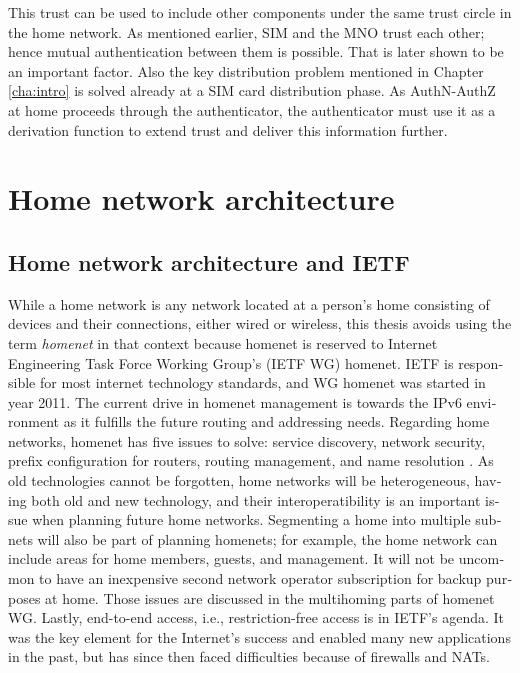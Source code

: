 \documentclass[12pt,a4paper,english]{tutthesis}
\begin{document}
\begin{otherlanguage}{english}
This trust can be used to include other components under the
same trust circle in the home network. As mentioned earlier,  SIM
and the MNO trust each other; hence mutual authentication between them is
possible. That is later shown to be an important factor.  Also the
key distribution problem mentioned in Chapter \ref{cha:intro} is solved
already at a SIM card distribution phase.  As AuthN-AuthZ at home
proceeds through the authenticator, the authenticator must
use it as a derivation function to extend trust 
 and deliver this information further.



\chapter{Home network architecture}
\label{sec-3}

\section{Home network architecture and IETF}
\label{sec-3-1}


While a home network is any network located at a person's home consisting
of devices and their connections, either wired or wireless,
this thesis avoids using the term \emph{homenet} in that context
because  homenet  is  reserved to 
Internet Engineering Task Force Working Group's (IETF
WG) homenet. IETF is responsible for  most internet technology standards, and 
WG homenet was started in year 2011.
The current drive in homenet management is towards the IPv6 environment
 as it fulfills the future routing and addressing needs. 
Regarding home networks, homenet has five issues to solve: service discovery, network security, 
prefix configuration for routers, routing management, and name
resolution \cite{homenet-charter}.
As old technologies cannot be forgotten, home networks will be heterogeneous, having both
old and new technology, and their interoperatibility is an important
issue when planning future home networks. 
Segmenting a home into multiple subnets will also be part of planning
 homenets; for example, the home network can include areas for home members, guests,
and management. It will not be uncommon to have an inexpensive second
network operator subscription for backup purposes at home. Those issues are
discussed in the  multihoming parts of homenet WG.
Lastly, end-to-end access, i.e., restriction-free access is in IETF's agenda. 
It was the key element for the Internet's success and enabled many new
applications in the past, but has since  then faced difficulties because of
firewalls and NATs. 




\end{otherlanguage}
\end{document}
